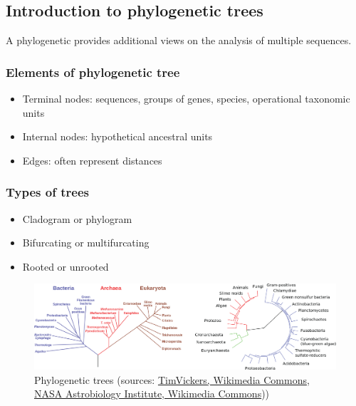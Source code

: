%
%

%
%
\subsection{Introduction to phylogenetic trees}
A phylogenetic provides additional views on the analysis of multiple sequences.

%
%
\subsubsection*{Elements of phylogenetic tree}
\begin{itemize}
\item Terminal nodes: sequences, groups of genes, species, operational taxonomic units
\item Internal nodes: hypothetical ancestral units
\item Edges: often represent distances
\end{itemize}

%
%
\subsubsection*{Types of trees}
\begin{itemize}
\item Cladogram or phylogram
\item Bifurcating or multifurcating
\item Rooted or unrooted
\end{itemize}

\begin{figure}[H]
  \centering
      \includegraphics[width=0.75 \textwidth]{fig09/root_unroot_tree_example.png}
  \caption{Phylogenetic trees (sources: \href{https://commons.wikimedia.org/w/index.php?curid=9381199}{TimVickers, Wikimedia Commons}, \href{https://commons.wikimedia.org/w/index.php?curid=1201601}{NASA Astrobiology Institute, Wikimedia Commons}))}
\end{figure}

